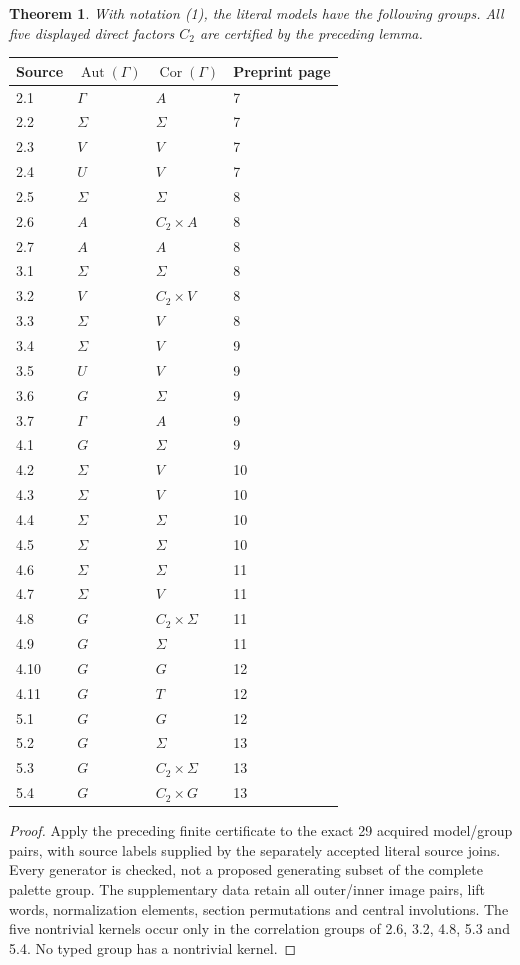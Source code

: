 \documentclass[11pt]{article}
\newtheorem{theorem}{Theorem}\newtheorem{lemma}[theorem]{Lemma}
\newcommand{\Aut}{\operatorname{Aut}}\newcommand{\Cor}{\operatorname{Cor}}
\begin{document}
\begin{theorem}
With notation (1), the literal models have the following groups.
All five displayed direct factors $C_2$ are certified by the preceding lemma.
\end{theorem}
\begin{center}\small
\begin{longtable}{@{}llll@{}}
\toprule Source & $\Aut(\Gamma)$ & $\Cor(\Gamma)$ & Preprint page\\\midrule
2.1&$\Gamma$&$A$&7\\
2.2&$\Sigma$&$\Sigma$&7\\
2.3&$V$&$V$&7\\
2.4&$U$&$V$&7\\
2.5&$\Sigma$&$\Sigma$&8\\
2.6&$A$&$C_2\times A$&8\\
2.7&$A$&$A$&8\\
3.1&$\Sigma$&$\Sigma$&8\\
3.2&$V$&$C_2\times V$&8\\
3.3&$\Sigma$&$V$&8\\
3.4&$\Sigma$&$V$&9\\
3.5&$U$&$V$&9\\
3.6&$G$&$\Sigma$&9\\
3.7&$\Gamma$&$A$&9\\
4.1&$G$&$\Sigma$&9\\
4.2&$\Sigma$&$V$&10\\
4.3&$\Sigma$&$V$&10\\
4.4&$\Sigma$&$\Sigma$&10\\
4.5&$\Sigma$&$\Sigma$&10\\
4.6&$\Sigma$&$\Sigma$&11\\
4.7&$\Sigma$&$V$&11\\
4.8&$G$&$C_2\times\Sigma$&11\\
4.9&$G$&$\Sigma$&11\\
4.10&$G$&$G$&12\\
4.11&$G$&$T$&12\\
5.1&$G$&$G$&12\\
5.2&$G$&$\Sigma$&13\\
5.3&$G$&$C_2\times\Sigma$&13\\
5.4&$G$&$C_2\times G$&13\\\bottomrule
\end{longtable}\end{center}
\begin{proof}
Apply the preceding finite certificate to the exact 29 acquired model/group
pairs, with source labels supplied by the separately accepted literal source
joins. Every generator is checked, not a proposed generating subset of the
complete palette group. The supplementary data retain all outer/inner image
pairs, lift words, normalization elements, section permutations and central
involutions. The five nontrivial kernels occur only in the correlation groups
of 2.6, 3.2, 4.8, 5.3 and 5.4. No typed group has a nontrivial kernel.
\end{proof}
\end{document}
